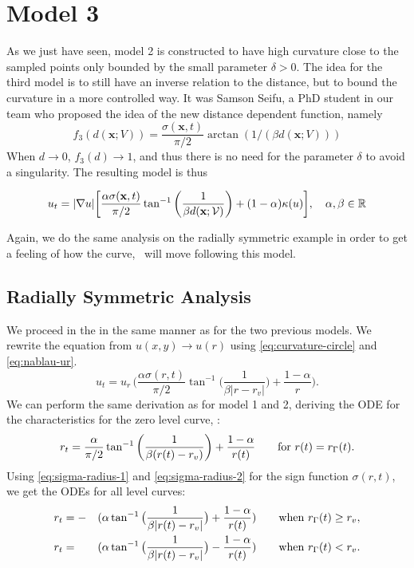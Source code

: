 \section{Model 3} 
As we just have seen, model 2 is constructed to have high curvature close to the sampled points only bounded by the small parameter $\delta>0$. The idea for the third model is to still have an inverse relation to the distance, but to bound the curvature in a more controlled way. It was Samson Seifu, a PhD student in our team who proposed the idea of the new distance dependent function, namely
\begin{equation*}
    f_3(d(\mathbf{x}; V)) = \frac{\sigma(\mathbf{x},t)}{\pi/2}\arctan(1/(\beta d(\mathbf{x}; V)))
\end{equation*} 
When $d\to 0$, $f_3(d) \to 1$, and thus there is no need for the parameter $\delta$ to avoid a singularity. The resulting model is thus

\begin{tcolorbox}[title=Model 3]
\begin{equation}
    u_t = |\nabla u| \bigg[ \frac{\alpha \sigma(\mathbf{x}, t)}{\pi/2} \tan^{-1}\bigg(\frac{1}{\beta d(\textbf{x};\mathcal{V})}\bigg) + (1-\alpha)\kappa (u) \bigg], \quad \alpha, \beta \in \mathbb{R}
    \label{eq:model3-pde}
\end{equation}
\end{tcolorbox}

Again, we do the same analysis on the radially symmetric example in order to get a feeling of how the curve, \curve\, will move following this model.

\subsection{Radially Symmetric Analysis}
We proceed in the in the same manner as for the two previous models. We rewrite the equation from $u(x, y)\to u(r)$ using \eqref{eq:curvature-circle} and \eqref{eq:nablau-ur}.
\begin{equation}
    u_t = u_r \, \bigg( \frac{\alpha \sigma(r, t)}{\pi/2} \tan^{-1}\bigg(\frac{1}{\beta |r-r_v|} \bigg) + \frac{1-\alpha}{r} \bigg).
    \label{eq:model3-rad}
\end{equation}
We can perform the same derivation as for model 1 and 2, deriving the ODE for the characteristics for the zero level curve, \curve:
\begin{equation}
    r_t = \frac{\alpha}{\pi/2} \tan^{-1}\bigg( \frac{1}{\beta(r(t)-r_v)}\bigg) + \frac{1-\alpha}{r(t)} \qquad \text{for } r(t)=r_{\Gamma}(t).
    \label{eq:model3-streamline-zero-levelcurve}
\end{equation}
Using \eqref{eq:sigma-radius-1} and \eqref{eq:sigma-radius-2} for the sign function $\sigma(r, t)$, we get the ODEs for all level curves:
\begin{alignat}{3}
    &r_t = - &(\alpha \tan^{-1}\big(\frac{1}{\beta|r(t)-r_v|} \big) + \frac{1-\alpha}{r(t)})  \qquad \text{when }&r_{\Gamma}(t)\geq r_v, \\
    &r_t =  &(\alpha \tan^{-1}\big(\frac{1}{\beta|r(t)-r_v|} \big) - \frac{1-\alpha}{r(t)})  \qquad \text{when } &r_{\Gamma}(t)< r_v.
\end{alignat}

